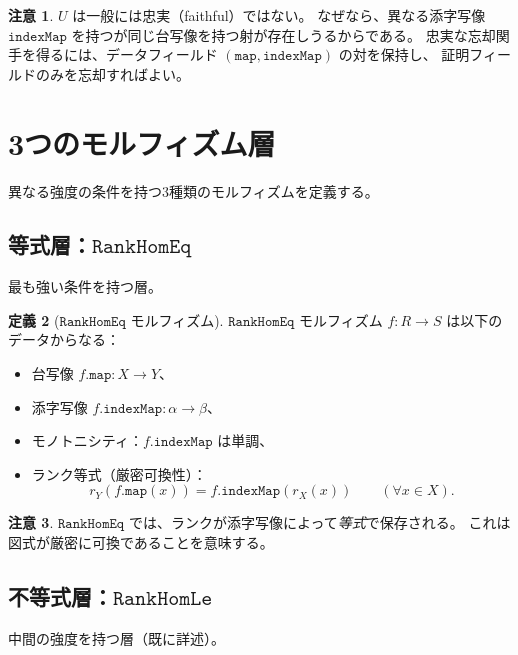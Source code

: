 \documentclass[11pt,a4paper,ja=standard]{bxjsarticle}
\theoremstyle{definition}
\newtheorem{definition}{定義}[section]
\newtheorem{remark}[definition]{注意}
\newcommand{\RankHomLe}{\mathtt{RankHomLe}}
\newcommand{\RankHomEq}{\mathtt{RankHomEq}}
\begin{document}
\begin{remark}
$U$ は一般には忠実（faithful）ではない。
なぜなら、異なる添字写像 $\mathtt{indexMap}$ を持つが同じ台写像を持つ射が存在しうるからである。
忠実な忘却関手を得るには、データフィールド $(\mathtt{map}, \mathtt{indexMap})$ の対を保持し、
証明フィールドのみを忘却すればよい。
\end{remark}

\section{3つのモルフィズム層}

異なる強度の条件を持つ3種類のモルフィズムを定義する。

\subsection{等式層：\texorpdfstring{$\RankHomEq$}{RankHomEq}}

最も強い条件を持つ層。

\begin{definition}[$\RankHomEq$ モルフィズム]\label{def:rankHomeq}
$\RankHomEq$ モルフィズム $f : R \to S$ は以下のデータからなる：
\begin{itemize}
\item 台写像 $f.\mathtt{map} : X \to Y$、
\item 添字写像 $f.\mathtt{indexMap} : \alpha \to \beta$、
\item モノトニシティ：$f.\mathtt{indexMap}$ は単調、
\item ランク等式（厳密可換性）：
\[
  r_Y(f.\mathtt{map}(x)) = f.\mathtt{indexMap}(r_X(x))
  \qquad (\forall x \in X).
\]
\end{itemize}
\end{definition}

\begin{remark}
$\RankHomEq$ では、ランクが添字写像によって\emph{等式}で保存される。
これは図式が厳密に可換であることを意味する。
\end{remark}

\subsection{不等式層：\texorpdfstring{$\RankHomLe$}{RankHomLe}}

中間の強度を持つ層（既に詳述）。
\end{document}
